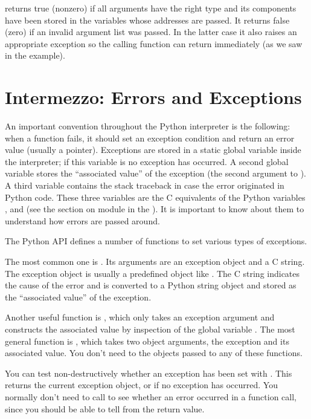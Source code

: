  returns true (nonzero) if all arguments have
the right type and its components have been stored in the variables
whose addresses are passed.  It returns false (zero) if an invalid
argument list was passed.  In the latter case it also raises an
appropriate exception so the calling function can return
\NULL{} immediately (as we saw in the example).


\section{Intermezzo: Errors and Exceptions
         \label{errors}}

An important convention throughout the Python interpreter is the
following: when a function fails, it should set an exception condition
and return an error value (usually a \NULL{} pointer).  Exceptions
are stored in a static global variable inside the interpreter; if this
variable is \NULL{} no exception has occurred.  A second global
variable stores the ``associated value'' of the exception (the second
argument to ).  A third variable contains the stack
traceback in case the error originated in Python code.  These three
variables are the C equivalents of the Python variables
,  and  (see
the section on module  in the
).  It is
important to know about them to understand how errors are passed
around.

The Python API defines a number of functions to set various types of
exceptions.

The most common one is .  Its arguments
are an exception object and a C string.  The exception object is
usually a predefined object like .  The
C string indicates the cause of the error and is converted to a
Python string object and stored as the ``associated value'' of the
exception.

Another useful function is , which only
takes an exception argument and constructs the associated value by
inspection of the global variable .  The most
general function is , which takes two object
arguments, the exception and its associated value.  You don't need to
 the objects passed to any of these functions.

You can test non-destructively whether an exception has been set with
.  This returns the current exception object,
or \NULL{} if no exception has occurred.  You normally don't need
to call  to see whether an error occurred in a
function call, since you should be able to tell from the return value.

